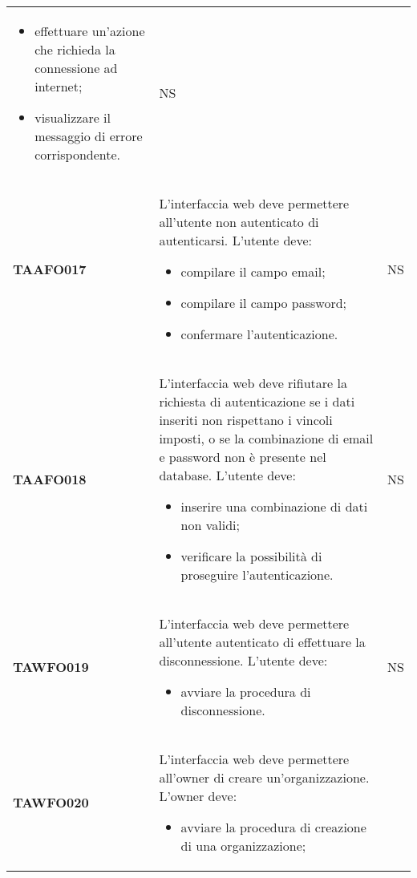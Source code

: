 \documentclass[../piano-di-qualifica.tex]{subfiles}
\begin{document}
\begin{centering}
\begin{longtable}[H]{>{\centering\bfseries}m{3cm} >{}p{10cm} >{\centering\arraybackslash}m{3cm}}
\begin{itemize}
                        \item effettuare un'azione che richieda la connessione ad internet;
                        \item visualizzare il messaggio di errore corrispondente.
                      \end{itemize}
                      & NS \\
        TAAFO017      & L'interfaccia web deve permettere all'utente non autenticato di autenticarsi. \newline
                      L'utente deve:
                      \begin{itemize}
                        \item compilare il campo email;
                        \item compilare il campo password;
                        \item confermare l'autenticazione.
                      \end{itemize}
                      & NS \\
        TAAFO018      & L'interfaccia web deve rifiutare la richiesta di autenticazione se i dati inseriti non rispettano i vincoli imposti, o se la combinazione di email e password non è presente nel database. \newline
                      L'utente deve:
                      \begin{itemize}
                        \item inserire una combinazione di dati non validi;
                        \item verificare la possibilità di proseguire l'autenticazione.
                      \end{itemize}
                      & NS \\
        TAWFO019      & L'interfaccia web deve permettere all'utente autenticato di effettuare la disconnessione. \newline
        L'utente deve:
        \begin{itemize}
         \item avviare la procedura di disconnessione.
        \end{itemize}
        & NS \\
        TAWFO020      & L'interfaccia web deve permettere all'owner di creare un'organizzazione. \newline
        L'owner deve:
        \begin{itemize}
         \item avviare la procedura di creazione di una organizzazione;

\end{itemize}
\end{longtable}
\end{centering}
\end{document}
